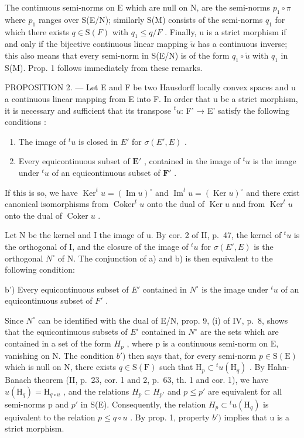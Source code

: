 The continuous semi-norms on E which are null on N, are the semi-norms \(p_{1} \circ \pi\) where \(p_{1}\) ranges over S(E/N); similarly S(M) consists of the semi-norms \(q_{1}\) for which there exists \(q \in \mathrm{S}(F)\) with \(q_{1} \leqslant q/F\) . Finally, u is a strict morphism if and only if the bijective continuous linear mapping \(\tilde{u}\) has a continuous inverse; this also means that every semi-norm in S(E/N) is of the form \(q_{1} \circ \tilde{u}\) with \(q_{1}\) in S(M). Prop. 1 follows immediately from these remarks.

PROPOSITION 2. --- Let E and F be two Hausdorff locally convex spaces and u a continuous linear mapping from E into F. In order that u be a strict morphism, it is necessary and sufficient that its transpose \({}^t u\): F' → E' satisfy the following conditions :

\begin{enumerate}
\def\labelenumi{\alph{enumi})}
\item
  The image of \(^{t}u\) is closed in \(E'\) for \(\sigma(E', E)\) .
\item
  Every equicontinuous subset of \(\mathbf{E}'\) , contained in the image of \({}^t u\) is the image under \({}^t u\) of an equicontinuous subset of \(\mathbf{F}'\) .
\end{enumerate}

If this is so, we have \(\operatorname{Ker}^t u = (\operatorname{Im} u)^\circ\) and \(\operatorname{Im}^t u = (\operatorname{Ker} u)^\circ\) and there exist canonical isomorphisms from \(\operatorname{Coker}^t u\) onto the dual of \(\operatorname{Ker} u\) and from \(\operatorname{Ker}^t u\) onto the dual of \(\operatorname{Coker} u\) .

Let N be the kernel and I the image of u. By cor. 2 of II, p.~47, the kernel of \(^{t}u\) is the orthogonal of I, and the closure of the image of \(^{t}u\) for \(\sigma(E', E)\) is the orthogonal \(N^{\circ}\) of N. The conjunction of a) and b) is then equivalent to the following condition:

b') Every equicontinuous subset of \(E'\) contained in \(N^{\circ}\) is the image under \(^{t}u\) of an equicontinuous subset of \(F'\) .

Since \(N^{\circ}\) can be identified with the dual of E/N, prop. 9, (i) of IV, p.~8, shows that the equicontinuous subsets of \(E'\) contained in \(N^{\circ}\) are the sets which are contained in a set of the form \(H_{p}\) , where p is a continuous semi-norm on E, vanishing on N. The condition \(b')\) then says that, for every semi-norm \(p \in \mathrm{S}(\mathrm{E})\) which is null on N, there exists \(q \in \mathrm{S}(\mathrm{F})\) such that \(\mathrm{H}_{p} \subset {}^{t}u(\mathrm{H}_{q})\) . By Hahn-Banach theorem (II, p.~23, cor. 1 and 2, p.~63, th. 1 and cor. 1), we have \(u(\mathrm{H}_{q}) = \mathrm{H}_{q \circ u}\) , and the relations \(H_{p} \subset H_{p'}\) and \(p \leqslant p'\) are equivalent for all semi-norms p and \(p'\) in S(E). Consequently, the relation \(H_{p} \subset {}^{t}u(\mathrm{H}_{q})\) is equivalent to the relation \(p \leqslant q \circ u\) . By prop. 1, property \(b')\) implies that u is a strict morphism.

